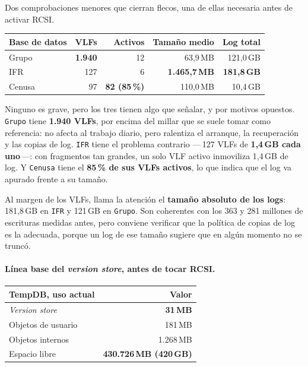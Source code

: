 \documentclass[11pt,a4paper]{article}
\newcommand{\cod}[1]{\texttt{\small #1}}
\newcommand{\critico}[1]{\textcolor{rojo}{\textbf{#1}}}
\newcommand{\bien}[1]{\textcolor{verde}{\textbf{#1}}}
\newcommand{\aviso}[1]{\textcolor{ambar}{\textbf{#1}}}
\begin{document}
Dos comprobaciones menores que cierran flecos, una de ellas necesaria antes
de activar RCSI.

\begin{table}[h]
\centering
\small
\begin{tabular}{lrrrr}
\toprule
\textbf{Base de datos} & \textbf{VLFs} & \textbf{Activos} &
\textbf{Tamaño medio} & \textbf{Log total} \\
\midrule
Grupo  & \aviso{1.940} & 12 & 63,9\,MB & 121,0\,GB \\
IFR    & 127 & 6 & \aviso{1.465,7\,MB} & \critico{181,8\,GB} \\
Cenusa & 97 & \aviso{82 (85\,\%)} & 110,0\,MB & 10,4\,GB \\
\bottomrule
\end{tabular}
\end{table}

Ninguno es grave, pero los tres tienen algo que señalar, y por motivos
opuestos. \cod{Grupo} tiene \textbf{1.940 VLFs}, por encima del millar que se
suele tomar como referencia: no afecta al trabajo diario, pero ralentiza el
arranque, la recuperación y las copias de log. \cod{IFR} tiene el problema
contrario —\,127 VLFs de \textbf{1,4\,GB cada uno}\,—: con fragmentos tan
grandes, un solo VLF activo inmoviliza 1,4\,GB de log. Y \cod{Cenusa} tiene
el \textbf{85\,\% de sus VLFs activos}, lo que indica que el log va apurado
frente a su tamaño.

Al margen de los VLFs, llama la atención el \textbf{tamaño absoluto de los
logs}: 181,8\,GB en \cod{IFR} y 121\,GB en \cod{Grupo}. Son coherentes con
los 363 y 281 millones de escrituras medidas antes, pero conviene verificar
que la política de copias de log es la adecuada, porque un log de ese tamaño
sugiere que en algún momento no se truncó.

\paragraph{Línea base del \emph{version store}, antes de tocar RCSI.}

\begin{table}[h]
\centering
\small
\begin{tabular}{lr}
\toprule
\textbf{TempDB, uso actual} & \textbf{Valor} \\
\midrule
\emph{Version store}   & \bien{31\,MB} \\
Objetos de usuario     & 181\,MB \\
Objetos internos       & 1.268\,MB \\
Espacio libre          & \bien{430.726\,MB (420\,GB)} \\
\bottomrule
\end{tabular}
\end{table}
\end{document}
